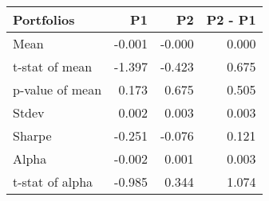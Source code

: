 \begin{tabular}{lrrr}
\toprule
Portfolios & P1 & P2 & P2 - P1 \\
\midrule
Mean & -0.001 & -0.000 & 0.000 \\
t-stat of mean & -1.397 & -0.423 & 0.675 \\
p-value of mean & 0.173 & 0.675 & 0.505 \\
Stdev & 0.002 & 0.003 & 0.003 \\
Sharpe & -0.251 & -0.076 & 0.121 \\
Alpha & -0.002 & 0.001 & 0.003 \\
t-stat of alpha & -0.985 & 0.344 & 1.074 \\
\bottomrule
\end{tabular}
